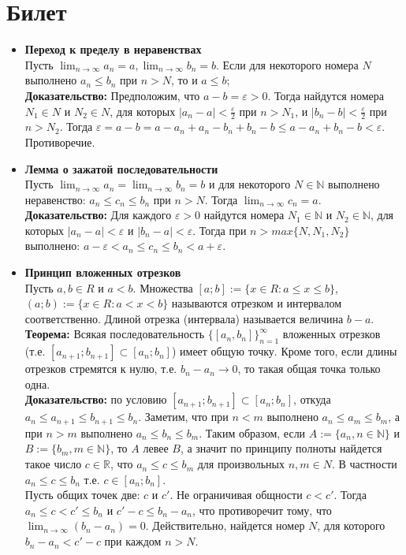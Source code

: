 \documentclass[12pt,a4paper]{article}
\begin{document}
\section{Билет}
\begin{itemize}
\item \textbf{Переход к пределу в неравенствах} \\
Пусть $\lim_{n \to \infty}{a_n = a}, \lim_{n \to \infty}{b_n = b}$. Если для некоторого номера $N$ выполнено $a_n \leq b_n$ при $n > N$, то и $a \leq b$; \\
\textbf{Доказательство:} Предположим, что $a-b = \varepsilon > 0$. Тогда найдутся номера $N_1 \in N$ и $N_2 \in N$, для которых $|a_n - a| < \frac{\varepsilon}{2}$ при $n > N_1$, и $|b_n-b| < \frac{\varepsilon}{2}$ при $n > N_2$. Тогда $\varepsilon = a - b = a - a_n + a_n - b_n + b_n - b \leq a - a_n + b_n - b < \varepsilon$. Противоречие. 

\item \textbf{ Лемма о зажатой последовательности} \\
Пусть $\lim_{n \to \infty}{a_n} = \lim_{n \to \infty}{b_n} = b$ и для некоторого $N \in \mathbb{N}$ выполнено неравенство: $a_n \leq c_n \leq b_n$ при $n > N$. Тогда $\lim_{n \to \infty}{c_n = a}$. \\
\textbf{Доказательство:} Для каждого $\varepsilon > 0$ найдутся номера $N_1 \in \mathbb{N}$ и $N_2 \in \mathbb{N}$, для которых $|a_n - a| < \varepsilon$ и $|b_n - a| < \varepsilon$. Тогда при $n > max\{N, N_1, N_2\}$ выполнено: $a - \varepsilon < a_n \leq c_n \leq b_n < a + \varepsilon$.

\item \textbf{Принцип вложенных отрезков} \\
Пусть $a, b \in R$ и $a < b$. Множества $[a; b] := \{x \in R: a \leq x \leq b\}$, $(a;b) := \{ x \in R: a < x < b \}$ называются отрезком и интервалом соответственно. Длиной отрезка (интервала) называется величина $b - a$. \\
\textbf{Теорема:} Всякая последовательность $\{[a_n, b_n]\}_{n=1}^{\infty}$ вложенных отрезков (т.е. $[a_{n+1};b_{n+1}] \subset [a_{n};b_{n}]$) имеет общую точку. Кроме того, если длины отрезков стремятся к нулю, т.е. $b_n - a_n \longrightarrow 0$, то такая общая точка только одна. \\
\textbf{Доказательство:} по условию $[a_{n+1}; b_{n+1}] \subset [a_{n}; b_{n}]$, откуда $a_{n} \leq a_{n+1} \leq b_{n+1} \leq b_n$. Заметим, что при $n < m$ выполнено $a_n \leq a_m \leq b_m$, а при $n > m$ выполнено $a_n \leq b_n \leq b_m$. Таким образом, если $A :=\{a_n, n \in \mathbb{N}\}$ и $B := \{b_m, m \in \mathbb{N}\}$, то $A$ левее $B$, а значит по принципу полноты найдется такое число $c \in \mathbb{R}$, что $a_n \leq c \leq b_m$ для произвольных $n, m \in N$. В частности $a_n \leq c \leq b_n$ т.е. $c \in [a_n; b_n]$. \\
Пусть общих точек две: $c$ и $c'$. Не ограничивая общности $c < c'$. Тогда $a_n \leq c < c' \leq b_n$ и $c' - c \leq b_n - a_n$, что противоречит тому, что $\lim_{n \to \infty}{(b_n - a_n)} = 0$. Действительно, найдется номер $N$, для которого $b_n - a_n < c' - c$ при каждом $n > N$.


\end{itemize}
\end{document}
